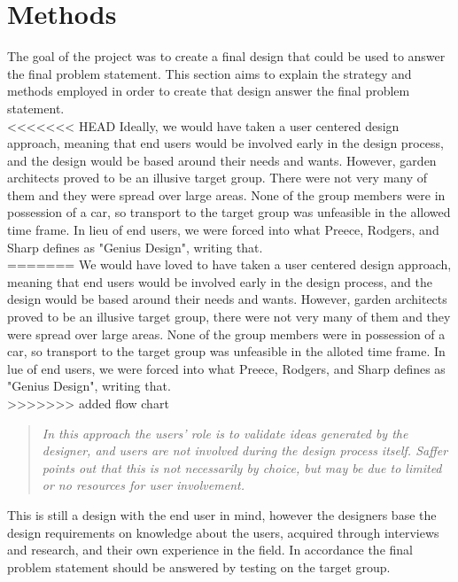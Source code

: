 \chapter{Methods}
The goal of the project was to create a final design that could be used to answer the final problem statement. This section aims to explain the strategy and methods employed in order to create that design answer the final problem statement.\\

<<<<<<< HEAD
Ideally, we would have taken a user centered design approach, meaning that end users would be involved early in the design process, and the design would be based around their needs and wants. However, garden architects proved to be an illusive target group. There were not very many of them and they were spread over large areas. None of the group members were in possession of a car, so transport to the target group was unfeasible in the allowed time frame. In lieu of end users, we were forced into what Preece, Rodgers, and Sharp defines as "Genius Design"\cite[p.~346]{interactionDesign}, writing that.\\
=======
We would have loved to have taken a user centered design approach, meaning that end users would be involved early in the design process, and the design would be based around their needs and wants. However, garden architects proved to be an illusive target group, there were not very many of them and they were spread over large areas. None of the group members were in possession of a car, so transport to the target group was unfeasible in the alloted time frame. In lue of end users, we were forced into what Preece, Rodgers, and Sharp defines as "Genius Design"\cite[p.~346]{interactionDesign}, writing that.\\
>>>>>>> added flow chart
	\begin{quote}
	\textit{In this approach the users’ role is to validate ideas generated by the designer, and users are not involved during the design process itself. Saffer points out that this is not necessarily by choice, but may be due to limited or no resources for user involvement.}\\
	\end{quote}

This is still a design with the end user in mind, however the designers base the design requirements on knowledge about the users, acquired through interviews and research, and their own experience in the field. In accordance the final problem statement should be answered by testing on the target group.\\

